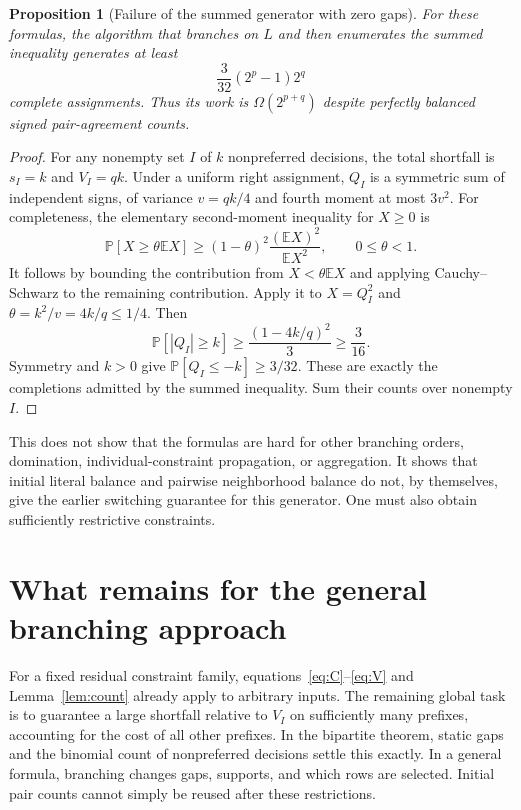 \documentclass[11pt,a4paper]{article}
\newtheorem{proposition}[theorem]{Proposition}
\newcommand{\E}{\mathbb E}
\newcommand{\Prb}{\mathbb P}
\begin{document}
\begin{proposition}[Failure of the summed generator with zero gaps]
For these formulas, the algorithm that branches on $L$ and then
enumerates the summed inequality generates at least
\[
 \frac3{32}(2^p-1)2^q
\]
complete assignments. Thus its work is $\Omega(2^{p+q})$ despite
perfectly balanced signed pair-agreement counts.
\end{proposition}
\begin{proof}
For any nonempty set $I$ of $k$ nonpreferred decisions, the total
shortfall is $s_I=k$ and $V_I=qk$. Under a uniform right assignment,
$Q_I$ is a symmetric sum of independent signs, of variance
$v=qk/4$ and fourth moment at most $3v^2$. For completeness, the
elementary second-moment inequality for $X\ge0$ is
\[
 \Prb[X\ge\theta\E X]\ge
 (1-\theta)^2\frac{(\E X)^2}{\E X^2},\qquad 0\le\theta<1.
\]
It follows by bounding the contribution from $X<\theta\E X$ and
applying Cauchy--Schwarz to the remaining contribution. Apply it to
$X=Q_I^2$ and $\theta=k^2/v=4k/q\le1/4$. Then
\[
 \Prb[|Q_I|\ge k]\ge\frac{(1-4k/q)^2}{3}\ge\frac3{16}.
\]
Symmetry and $k>0$ give
$\Prb[Q_I\le-k]\ge3/32$. These are exactly the completions admitted
by the summed inequality. Sum their counts over nonempty $I$.
\end{proof}

This does not show that the formulas are hard for other branching
orders, domination, individual-constraint propagation, or aggregation.
It shows that initial literal balance and pairwise neighborhood balance
do not, by themselves, give the earlier switching guarantee for this
generator. One must also obtain sufficiently restrictive constraints.

\clearpage
\section{What remains for the general branching approach}

For a fixed residual constraint family, equations~\eqref{eq:C}--\eqref{eq:V}
and Lemma~\ref{lem:count} already apply to arbitrary inputs. The
remaining global task is to guarantee a large shortfall relative to
$V_I$ on sufficiently many prefixes, accounting for the cost of all
other prefixes. In the bipartite theorem, static gaps and the binomial
count of nonpreferred decisions settle this exactly. In a general
formula, branching changes gaps, supports, and which rows are selected.
Initial pair counts cannot simply be reused after these restrictions.
\end{document}
